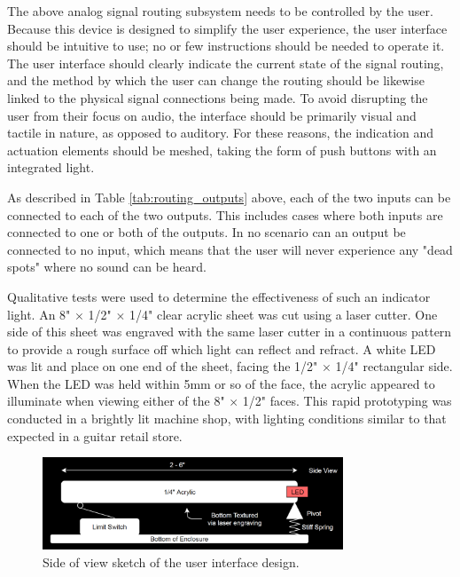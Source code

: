\documentclass{article}
\begin{document}
	The above analog signal routing subsystem needs to be controlled by the user.  Because this device is designed to simplify the user experience, the user interface should be intuitive to use; no or few instructions should be needed to operate it.  The user interface should clearly indicate the current state of the signal routing, and the method by which the user can change the routing should be likewise linked to the physical signal connections being made.  To avoid disrupting the user from their focus on audio, the interface should be primarily visual and tactile in nature, as opposed to auditory.  For these reasons, the indication and actuation elements should be meshed, taking the form of push buttons with an integrated light.

	As described in Table \ref{tab:routing_outputs} above, each of the two inputs can be connected to each of the two outputs.  This includes cases where both inputs are connected to one or both of the outputs.  In no scenario can an output be connected to no input, which means that the user will never experience any "dead spots" where no sound can be heard.

	Qualitative tests were used to determine the effectiveness of such an indicator light.  An 8" $\times$ 1/2" $\times$ 1/4" clear acrylic sheet was cut using a laser cutter.  One side of this sheet was engraved with the same laser cutter in a continuous pattern to provide a rough surface off which light can reflect and refract.  A white LED was lit and place on one end of the sheet, facing the 1/2" $\times$ 1/4" rectangular side.  When the LED was held within 5mm or so of the face, the acrylic appeared to illuminate when viewing either of the 8" $\times$ 1/2" faces.  This rapid prototyping was conducted in a brightly lit machine shop, with lighting conditions similar to that expected in a guitar retail store.

	\begin{figure}
		\centering
		\includegraphics[width = 0.8\textwidth]{PR4Images/oldUIsideview.png}
		\caption{Side of view sketch of the user interface design.}
		\label{fig:UIsketch}
	\end{figure}
\end{document}

